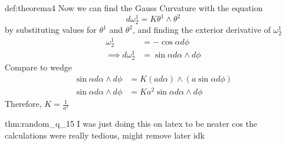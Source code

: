 \documentclass[landscape, 8pt]{extarticle}
\begin{document}
\begin{multicols}{3}
\begin{xmp}{def:theorema}{4}
    Now we can find the Gauss Curvature with the equation
    \[d\omega^{1}_{2} = K\theta^{1}\wedge \theta^{2}\]
    by substituting values for \(\theta^{1}\) and \(\theta^{2}\), and finding the exterior derivative of \(\omega^{1}_{2}\)
    \begin{align*}
        \omega^{1}_{2} &= -\cos\alpha d\phi \\
        \implies d\omega^{1}_{2} &= \sin\alpha d\alpha\wedge d\phi
    \end{align*}
    Compare to wedge
    \begin{align*}
        \sin\alpha d\alpha\wedge d\phi &= K (ad\alpha) \wedge (a\sin\alpha d\phi) \\
        \sin\alpha d\alpha\wedge d\phi&= K a^{2}\sin\alpha d\alpha\wedge d\phi
    \end{align*}
    Therefore, \(\displaystyle K = \frac{1}{a^{2}}\)
\end{xmp}

\begin{xmp}[random q]{thm:random_q_1}{5}
    I was just doing this on latex to be neater cos the calculations were really tedious, might remove later idk


\end{xmp}
\end{multicols}
\end{document}
